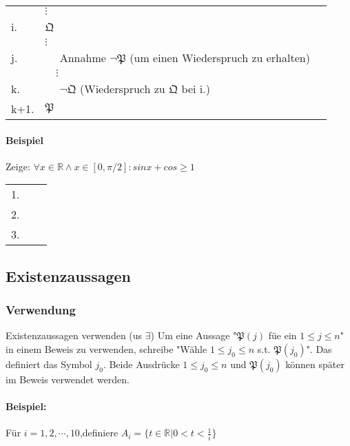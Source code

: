                 \begin{tabular}{p{0.8cm}p{6cm}p{4cm}}
                       & \(\vdots\) & \\
                    i. & \(\mathfrak{Q}\) & \\
                       & \(\vdots\) & \\
                    j. & \(\quad\) Annahme \(\lnot \mathfrak{P}\) (um einen Wiederspruch zu erhalten) & \\
                       & \(\quad \vdots\) & \\
                    k. & \(\quad\) \(\lnot \mathfrak{Q}\) (Wiederspruch zu \(\mathfrak{Q}\) bei i.) & \\
                    k+1.& \(\mathfrak{P}\) & \\

                \end{tabular}
        \paragraph{Beispiel}
            Zeige: \(\forall x \in \mathbb{R} \wedge x \in [0, \pi / 2] : sin x + cos \geq 1\)
            \begin{tabular}{p{0.8cm}p{6cm}p{4cm}}
                1. &  &  \\
                2. &  &  \\
                3. &  &  \\
            \end{tabular}
    \subsection{Existenzaussagen}
        \subsubsection{Verwendung}
            {
                Existenzaussagen verwenden (us \(\exists\))
            }
            {
                Um eine Aussage "\(\mathfrak{P}(j)\) füe ein \(1 \leq j \leq n\)" in einem Beweis zu verwenden, schreibe "Wähle \(1 \leq j_0 \leq n\) s.t. \(\mathfrak{P}(j_0)\)". Das definiert das Symbol \(j_0\). Beide Ausdrücke \(1 \leq j_0 \leq n\) und \(\mathfrak{P}(j_0)\) können später im Beweis verwendet werden.
            }
            \paragraph{Beispiel:}
                Für \(i = 1, 2, \cdots, 10\),definiere \(A_i = \{t \in \mathbb{R} \vert 0 < t < \frac{1}{i}\}\)
